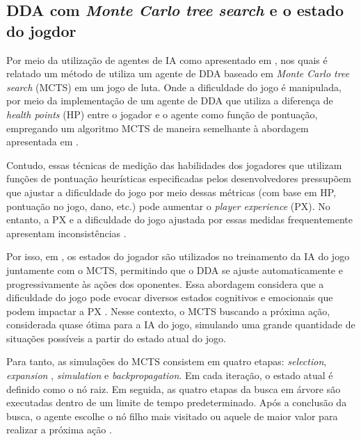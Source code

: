 \subsection{DDA com \textit{Monte Carlo tree search} e o estado do jogdor}    
    Por meio da utilização de agentes de IA como 
    apresentado em 
    \cite{demediuk2017monte,ishihara2018monte},
    nos quais é relatado um método de utiliza um agente 
    de DDA baseado em \textit{Monte Carlo tree search} 
    (MCTS) em um jogo de luta. Onde a dificuldade do jogo
    é manipulada, por meio da implementação de um agente 
    de DDA que utiliza a diferença de 
    \textit{health points} (HP) entre o jogador e o 
    agente como função de pontuação, empregando um 
    algoritmo MCTS de maneira semelhante à abordagem 
    apresentada em \cite{moon2022diversifying}.
    
    Contudo, essas técnicas de medição das habilidades dos
    jogadores que utilizam funções de pontuação heurísticas
    especificadas pelos desenvolvedores pressupõem que 
    ajustar a dificuldade do jogo por meio dessas métricas
    (com base em HP, pontuação no jogo, dano, etc.)
    pode aumentar o \textit{player experience} (PX). 
    No entanto, a PX e a dificuldade do jogo 
    ajustada por essas medidas frequentemente apresentam 
    inconsistências
    \cite{ang2017comparing,constant2019dynamic}.

    Por isso, em \cite{moon2022diversifying}, os estados 
    do jogador são utilizados no treinamento da IA do 
    jogo juntamente com o MCTS, permitindo que o DDA se 
    ajuste automaticamente e progressivamente às ações 
    dos oponentes. Essa abordagem considera que a 
    dificuldade do jogo pode evocar diversos estados 
    cognitivos e emocionais que podem impactar a PX 
    \cite{kivikangas2011review}. Nesse contexto, o MCTS 
    buscando a próxima ação, considerada quase 
    ótima para a IA do jogo, simulando uma grande 
    quantidade de situações possíveis a partir do estado
    atual do jogo. 
    
    Para tanto, as simulações do MCTS consistem em quatro 
    etapas: \textit{selection}, \textit{expansion}
    , \textit{simulation} e \textit{backpropagation}. 
    Em cada iteração, o estado atual é definido como o nó
    raiz. Em seguida, as quatro etapas da busca em 
    árvore são executadas dentro de um limite
    de tempo predeterminado. Após a conclusão da busca, 
    o agente escolhe o nó filho mais visitado ou aquele 
    de maior valor para realizar a próxima ação 
    \cite{moon2022diversifying}.

